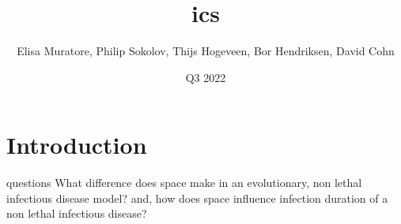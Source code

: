 \documentclass{article}
\title{ics}
\author{Elisa Muratore, Philip Sokolov, Thijs Hogeveen, Bor Hendriksen, David Cohn}
\date{Q3 2022}
\begin{document}
\maketitle

\section{Introduction}

\research questions {What difference does space make in an evolutionary, non lethal infectious disease model? and, how does space influence infection duration of a non lethal infectious disease?}
\end{document}

